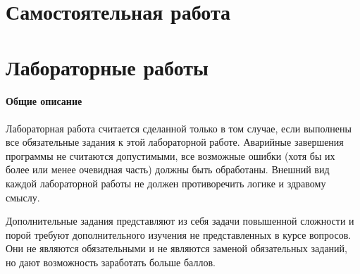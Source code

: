 \documentclass[a4paper, 13pt]{article}
\begin{document}
\newpage

\tableofcontents
\newpage

\part{Самостоятельная работа} 
\newpage












\newpage

\part{Лабораторные работы}
\subsection*{Общие описание}

Лабораторная работа считается сделанной только в том случае, если выполнены все обязательные задания к этой лабораторной работе. Аварийные завершения программы не считаются допустимыми, все возможные ошибки (хотя бы их более или менее очевидная часть) должны быть обработаны. Внешний вид каждой лабораторной работы не должен противоречить логике и здравому смыслу.

Дополнительные задания представляют из себя задачи повышенной сложности и порой требуют дополнительного изучения не представленных в курсе вопросов. Они не являются обязательными и не являются заменой обязательных заданий, но дают возможность заработать больше баллов.

\end{document}
